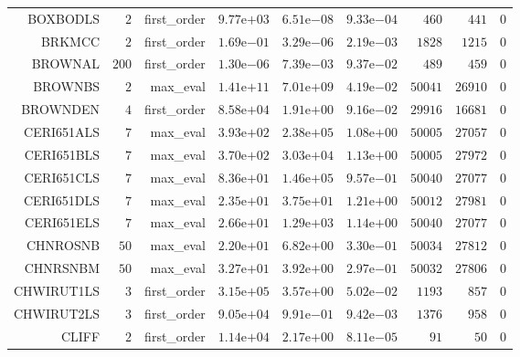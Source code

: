 \begin{longtable}{rrrrrrrrr}
BOXBODLS & \(     2\) & first\_order & \( 9.77\)e\(+03\) & \( 6.51\)e\(-08\) & \( 9.33\)e\(-04\) & \(   460\) & \(   441\) & \(     0\) \\
BRKMCC & \(     2\) & first\_order & \( 1.69\)e\(-01\) & \( 3.29\)e\(-06\) & \( 2.19\)e\(-03\) & \(  1828\) & \(  1215\) & \(     0\) \\
BROWNAL & \(   200\) & first\_order & \( 1.30\)e\(-06\) & \( 7.39\)e\(-03\) & \( 9.37\)e\(-02\) & \(   489\) & \(   459\) & \(     0\) \\
BROWNBS & \(     2\) & max\_eval & \( 1.41\)e\(+11\) & \( 7.01\)e\(+09\) & \( 4.19\)e\(-02\) & \( 50041\) & \( 26910\) & \(     0\) \\
BROWNDEN & \(     4\) & first\_order & \( 8.58\)e\(+04\) & \( 1.91\)e\(+00\) & \( 9.16\)e\(-02\) & \( 29916\) & \( 16681\) & \(     0\) \\
CERI651ALS & \(     7\) & max\_eval & \( 3.93\)e\(+02\) & \( 2.38\)e\(+05\) & \( 1.08\)e\(+00\) & \( 50005\) & \( 27057\) & \(     0\) \\
CERI651BLS & \(     7\) & max\_eval & \( 3.70\)e\(+02\) & \( 3.03\)e\(+04\) & \( 1.13\)e\(+00\) & \( 50005\) & \( 27972\) & \(     0\) \\
CERI651CLS & \(     7\) & max\_eval & \( 8.36\)e\(+01\) & \( 1.46\)e\(+05\) & \( 9.57\)e\(-01\) & \( 50040\) & \( 27077\) & \(     0\) \\
CERI651DLS & \(     7\) & max\_eval & \( 2.35\)e\(+01\) & \( 3.75\)e\(+01\) & \( 1.21\)e\(+00\) & \( 50012\) & \( 27981\) & \(     0\) \\
CERI651ELS & \(     7\) & max\_eval & \( 2.66\)e\(+01\) & \( 1.29\)e\(+03\) & \( 1.14\)e\(+00\) & \( 50040\) & \( 27077\) & \(     0\) \\
CHNROSNB & \(    50\) & max\_eval & \( 2.20\)e\(+01\) & \( 6.82\)e\(+00\) & \( 3.30\)e\(-01\) & \( 50034\) & \( 27812\) & \(     0\) \\
CHNRSNBM & \(    50\) & max\_eval & \( 3.27\)e\(+01\) & \( 3.92\)e\(+00\) & \( 2.97\)e\(-01\) & \( 50032\) & \( 27806\) & \(     0\) \\
CHWIRUT1LS & \(     3\) & first\_order & \( 3.15\)e\(+05\) & \( 3.57\)e\(+00\) & \( 5.02\)e\(-02\) & \(  1193\) & \(   857\) & \(     0\) \\
CHWIRUT2LS & \(     3\) & first\_order & \( 9.05\)e\(+04\) & \( 9.91\)e\(-01\) & \( 9.42\)e\(-03\) & \(  1376\) & \(   958\) & \(     0\) \\
CLIFF & \(     2\) & first\_order & \( 1.14\)e\(+04\) & \( 2.17\)e\(+00\) & \( 8.11\)e\(-05\) & \(    91\) & \(    50\) & \(     0\) \\

\end{longtable}
